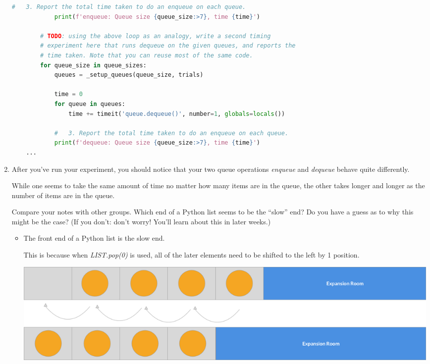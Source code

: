 \documentclass[12pt]{article}
\begin{document}
\begin{enumerate}[1.]
\begin{lstlisting}[language=Python,caption={task\_3\_q1\_solution.py},captionpos=b]
            #   3. Report the total time taken to do an enqueue on each queue.
            print(f'enqueue: Queue size {queue_size:>7}, time {time}')

        # TODO: using the above loop as an analogy, write a second timing
        # experiment here that runs dequeue on the given queues, and reports the
        # time taken. Note that you can reuse most of the same code.
        for queue_size in queue_sizes:
            queues = _setup_queues(queue_size, trials)

            time = 0
            for queue in queues:
                time += timeit('queue.dequeue()', number=1, globals=locals())

            #   3. Report the total time taken to do an enqueue on each queue.
            print(f'dequeue: Queue size {queue_size:>7}, time {time}')
    ...
    \end{lstlisting}

    \item After you’ve run your experiment, you should notice that your two queue
    operations \textit{enqueue} and \textit{dequeue} behave quite differently.

    \bigskip

    While one seems to take the same amount of time no matter how many items are
    in the queue, the other takes longer and longer as the number of items are in
    the queue.

    \bigskip

    Compare your notes with other groups.
    Which end of a Python list seems to be the “slow” end? Do you have a guess
    as to why this might be the case? (If you don't: don't worry! You'll learn
    about this in later weeks.)

    \bigskip

    \begin{itemize}
        \item

        The front end of a Python list is the slow end.

        \bigskip

        This is because when \textit{LIST.pop(0)} is used, all of the later elements
        need to be shifted to the left by 1 position.

        \bigskip

        \begin{center}
        \includegraphics[width=0.8 \linewidth]{../../images/lab4_t3_q3_solution.png}
        \end{center}

    \end{itemize}

\end{enumerate}
\end{document}
